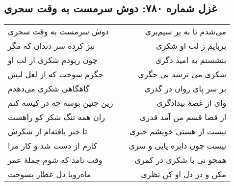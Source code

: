 \begin{center}
\section*{غزل شماره ۷۸۰: دوش سرمست به وقت سحری}
\label{sec:780}
\begin{longtable}{l p{0.5cm} r}
دوش سرمست به وقت سحری
&&
می‌شدم تا به بر سیم‌بری
\\
تیز کرده سر دندان که مگر
&&
بربایم ز لب او شکری
\\
چون ربودم شکری از لب او
&&
بنشستم به امید دگری
\\
جگرم سوخت که از لعل لبش
&&
شکری می نرسد بی جگری
\\
گاهگاهی شکری می‌دهدم
&&
بر سر پای روان در گذری
\\
زین چنین بوسه چه در کیسه کنم
&&
وای از غصهٔ بیدادگری
\\
زان همه تنگ شکر کو راهست
&&
از قضا قسم من آمد قدری
\\
تا خبر یافته‌ام از شکرش
&&
نیست از هستی خویشم خبری
\\
کارم از دست شد و کار مرا
&&
نیست چون دایره پایی و سری
\\
وقت نامد که شوم جملهٔ عمر
&&
همچو نی با شکری در کمری
\\
ماه‌رویا دل عطار بسوخت
&&
مکن و در دل او کن نظری
\\
\end{longtable}
\end{center}
